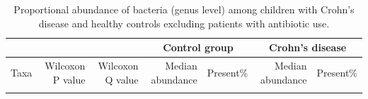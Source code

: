 \newpage
{\footnotesize
	\renewcommand{\arraystretch}{0.7} \setlength{\tabcolsep}{3pt}
	\begin{longtable}{ | l | r | r | r | r | r | r  | }
		\caption[Proportional abundance of bacteria (genus level) among children with Crohn’s disease and healthy controls excluding patients with antibiotic use]{Proportional abundance of bacteria (genus level) among children with Crohn’s disease and healthy controls excluding patients with antibiotic use.} 
		\label{TS6} \\
		
		\hline
		\multicolumn{3}{|c|}{} & \multicolumn{2}{c}{Control group}
		& \multicolumn{2}{|c|}{Crohn's disease}\\
		\hline 
		Taxa & Wilcoxon P value & Wilcoxon Q value & Median abundance & Present\% & Median abundance & Present\% \\ 
		\hline 
		\endfirsthead
		
		
		\endfoot
		
		\hline 
		\endlastfoot
		
		
		

\end{longtable}}
